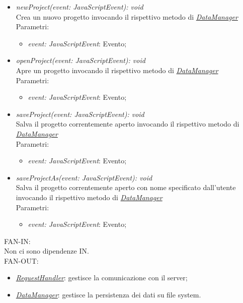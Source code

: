 \documentclass[../DefinizioneDiProdotto.tex]{subfiles}
\begin{document}
\begin{itemize}
\begin{itemize}
							\item \emph{newProject(event: JavaScriptEvent): void} \\
							Crea un nuovo progetto invocando il rispettivo metodo di \hyperlink{SWEDesigner::Model::DataManager}{\emph{DataManager}} \\
							Parametri:
							\begin{itemize}
								\item \emph{event: JavaScriptEvent}: Evento;
							\end{itemize}
							\item \emph{openProject(event: JavaScriptEvent): void} \\
							Apre un progetto invocando il rispettivo metodo di \hyperlink{SWEDesigner::Model::DataManager}{\emph{DataManager}} \\
							Parametri:
							\begin{itemize}
								\item \emph{event: JavaScriptEvent}: Evento;
							\end{itemize}
							\item \emph{saveProject(event: JavaScriptEvent): void} \\
							Salva il progetto correntemente aperto invocando il rispettivo metodo di \hyperlink{SWEDesigner::Model::DataManager}{\emph{DataManager}} \\
							Parametri:
							\begin{itemize}
								\item \emph{event: JavaScriptEvent}: Evento;
							\end{itemize}
							\item \emph{saveProjectAs(event: JavaScriptEvent): void} \\
							Salva il progetto correntemente aperto con nome specificato dall'utente invocando il rispettivo metodo di \hyperlink{SWEDesigner::Model::DataManager}{\emph{DataManager}} \\
							Parametri:
							\begin{itemize}
								\item \emph{event: JavaScriptEvent}: Evento;
							\end{itemize}
						\end{itemize}
						FAN-IN:\\
						Non ci sono dipendenze IN.\\
						FAN-OUT:
						\begin{itemize}
							\item \hyperlink{SWEDesigner::Model::RequestHandler}{\emph{RequestHandler}}: gestisce la comunicazione con il server;
							\item \hyperlink{SWEDesigner::Model::DataManager}{\emph{DataManager}}: gestisce la persistenza dei dati su file system.
						\end{itemize}
					\end{itemize}
\end{document}

